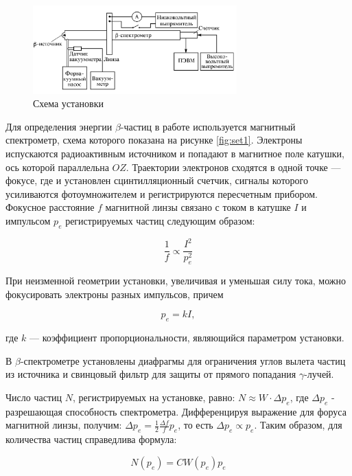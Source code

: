 \documentclass[a4paper, 12pt]{article}
\begin{document}
\begin{figure}[H]
    \centering
    \includegraphics[width=0.7\textwidth]{set2.png}
    \caption{Схема установки}
    \label{fig:set2}
\end{figure}

Для определения энергии $\beta$-частиц в работе используется магнитный спектрометр, схема которого показана на рисунке \ref{fig:set1}. Электроны испускаются радиоактивным источником и попадают в магнитное поле катушки, ось которой параллельна $OZ$. Траектории электронов сходятся в одной точке --- фокусе, где и установлен сцинтилляционный счетчик, сигналы которого усиливаются фотоумножителем и регистрируются пересчетным прибором. Фокусное расстояние $f$ магнитной линзы связано с током в катушке $I$ и импульсом $p_e$ регистрируемых частиц следующим образом:

\begin{equation}
	\frac{1}{f} \propto \frac{I^2}{p_e^2}	
\end{equation}

При неизменной геометрии установки, увеличивая и уменьшая силу тока, можно фокусировать электроны разных импульсов, причем 
	
\begin{equation}
	p_e = kI,
\end{equation}
	
где $k$ --- коэффициент пропорциональности, являющийся параметром установки. 

В $\beta$-спектрометре установлены диафрагмы для ограничения углов вылета частиц из источника и свинцовый фильтр для защиты от прямого попадания $\gamma$-лучей. 

Число частиц $N$, регистрируемых на установке, равно: $N \approx W \cdot \Delta p_e$, где $\Delta p_e$ - разрешающая способность спектрометра. Дифференцируя выражение для форуса магнитной линзы, получим: $\Delta p_e = \frac{1}{2}\frac{\Delta f}{f}p_e$, то есть $\Delta p_e \propto p_e$. Таким образом, для количества частиц справедлива формула: 

\begin{equation}
	N(p_e) = CW(p_e)p_e 
\end{equation}
\end{document}
